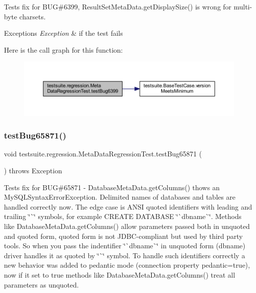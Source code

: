 Tests fix for B\+UG\#6399, Result\+Set\+Meta\+Data.\+get\+Display\+Size() is wrong for multi-\/byte charsets.


\begin{DoxyExceptions}{Exceptions}
{\em Exception} & if the test fails \\
\hline
\end{DoxyExceptions}
Here is the call graph for this function\+:
\nopagebreak
\begin{figure}[H]
\begin{center}
\leavevmode
\includegraphics[width=350pt]{classtestsuite_1_1regression_1_1_meta_data_regression_test_ad90f2153ff1faa28e41a28116ad400ca_cgraph}
\end{center}
\end{figure}
\mbox{\label{classtestsuite_1_1regression_1_1_meta_data_regression_test_a8cde8eefe9689a7113484b6de4827afd}} 
\subsubsection{\texorpdfstring{test\+Bug65871()}{testBug65871()}}
{\footnotesize\ttfamily void testsuite.\+regression.\+Meta\+Data\+Regression\+Test.\+test\+Bug65871 (\begin{DoxyParamCaption}{ }\end{DoxyParamCaption}) throws Exception}

Tests fix for B\+UG\#65871 -\/ Database\+Meta\+Data.\+get\+Columns() thows an My\+S\+Q\+L\+Syntax\+Error\+Exception. Delimited names of databases and tables are handled correctly now. The edge case is A\+N\+SI quoted identifiers with leading and trailing \char`\"{}\`{}\char`\"{} symbols, for example C\+R\+E\+A\+TE D\+A\+T\+A\+B\+A\+SE \char`\"{}\`{}dbname\`{}\char`\"{}. Methods like Database\+Meta\+Data.\+get\+Columns() allow parameters passed both in unquoted and quoted form, quoted form is not J\+D\+B\+C-\/compliant but used by third party tools. So when you pass the indentifier \char`\"{}\`{}dbname\`{}\char`\"{} in unquoted form ({\ttfamily dbname}) driver handles it as quoted by \char`\"{}\`{}\char`\"{} symbol. To handle such identifiers correctly a new behavior was added to pedantic mode (connection property pedantic=true), now if it set to true methods like Database\+Meta\+Data.\+get\+Columns() treat all parameters as unquoted.



